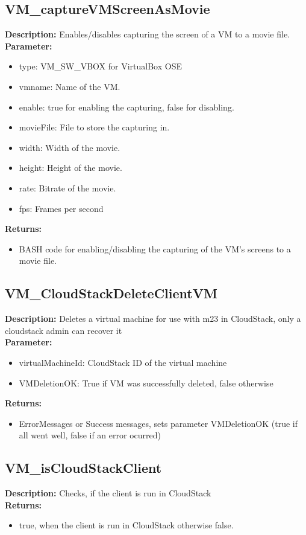 \subsection{VM\_captureVMScreenAsMovie}
\textbf{Description:} Enables/disables capturing the screen of a VM to a movie file.\\
\textbf{Parameter:}
\begin{itemize}
\item type: VM\_SW\_VBOX for VirtualBox OSE
\item vmname: Name of the VM.
\item enable: true for enabling the capturing, false for disabling.
\item movieFile: File to store the capturing in.
\item width: Width of the movie.
\item height: Height of the movie.
\item rate: Bitrate of the movie.
\item fps: Frames per second
\end{itemize}
\textbf{Returns:}
\begin{itemize}
\item BASH code for enabling/disabling the capturing of the VM's screens to a movie file.
\end{itemize}

\subsection{VM\_CloudStackDeleteClientVM}
\textbf{Description:} Deletes a virtual machine for use with m23 in CloudStack, only a cloudstack admin can recover it\\
\textbf{Parameter:}
\begin{itemize}
\item virtualMachineId:  CloudStack ID of the virtual machine
\item VMDeletionOK: True if VM was successfully deleted, false otherwise
\end{itemize}
\textbf{Returns:}
\begin{itemize}
\item ErrorMessages or Success messages, sets parameter VMDeletionOK (true if all went well, false if an error ocurred)
\end{itemize}

\subsection{VM\_isCloudStackClient}
\textbf{Description:} Checks, if the client is run in CloudStack\\
\textbf{Returns:}
\begin{itemize}
\item true, when the client is run in CloudStack otherwise false.
\end{itemize}


